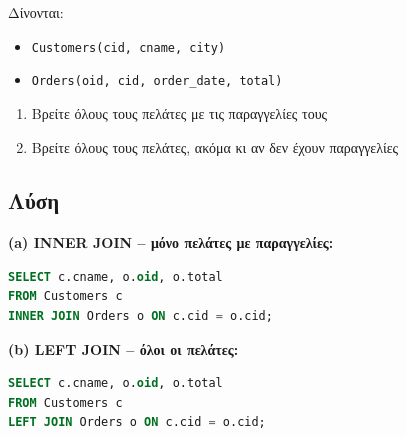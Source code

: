 \begin{formulabox}[Εκφώνηση]
Δίνονται:
\begin{itemize}
    \item \texttt{Customers(cid, cname, city)}
    \item \texttt{Orders(oid, cid, order\_date, total)}
\end{itemize}

\begin{enumerate}
    \item Βρείτε όλους τους πελάτες με τις παραγγελίες τους
    \item Βρείτε όλους τους πελάτες, ακόμα κι αν δεν έχουν παραγγελίες
\end{enumerate}
\end{formulabox}

\subsection*{Λύση}

\textbf{(a) INNER JOIN -- μόνο πελάτες με παραγγελίες:}

\begin{lstlisting}[language=SQL]
SELECT c.cname, o.oid, o.total
FROM Customers c
INNER JOIN Orders o ON c.cid = o.cid;
\end{lstlisting}

\textbf{(b) LEFT JOIN -- όλοι οι πελάτες:}

\begin{lstlisting}[language=SQL]
SELECT c.cname, o.oid, o.total
FROM Customers c
LEFT JOIN Orders o ON c.cid = o.cid;
\end{lstlisting}

\begin{center}
\end{center}

